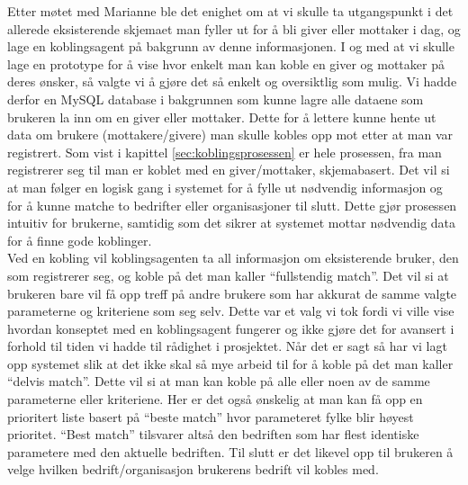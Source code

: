Etter møtet med Marianne ble det enighet om at vi skulle ta utgangspunkt i det allerede eksisterende skjemaet man fyller ut for å bli giver eller mottaker i dag, og lage en koblingsagent på bakgrunn av denne informasjonen. I og med at vi skulle lage en prototype for å vise hvor enkelt man kan koble en giver og mottaker på deres ønsker, så valgte vi å gjøre det så enkelt og oversiktlig som mulig. Vi hadde derfor en MySQL database i bakgrunnen som kunne lagre alle dataene som brukeren la inn om en giver eller mottaker. Dette for å lettere kunne hente ut data om brukere (mottakere/givere) man skulle kobles opp mot etter at man var registrert. Som vist i kapittel \ref{sec:koblingsprosessen} er hele prosessen, fra man registrerer seg til man er koblet med en giver/mottaker, skjemabasert. Det vil si at man følger en logisk gang i systemet for å fylle ut nødvendig informasjon og for å kunne matche to bedrifter eller organisasjoner til slutt. Dette gjør prosessen intuitiv for brukerne, samtidig som det sikrer at systemet mottar nødvendig data for å finne gode koblinger.\\

Ved en kobling vil koblingsagenten ta all informasjon om eksisterende bruker, den som registrerer seg, og koble på det man kaller ``fullstendig match''. Det vil si at brukeren bare vil få opp treff på andre brukere som har akkurat de samme valgte parameterne og kriteriene som seg selv. Dette var et valg vi tok fordi vi ville vise hvordan konseptet med en koblingsagent fungerer og ikke gjøre det for avansert i forhold til tiden vi hadde til rådighet i prosjektet. Når det er sagt så har vi lagt opp systemet slik at det ikke skal så mye arbeid til for å koble på det man kaller ``delvis match''. Dette vil si at man kan koble på alle eller noen av de samme parameterne eller kriteriene. Her er det også ønskelig at man kan få opp en prioritert liste basert på ``beste match'' hvor parameteret fylke blir høyest prioritet. ``Best match'' tilsvarer altså den bedriften som har flest identiske parametere med den aktuelle bedriften. Til slutt er det likevel opp til brukeren å velge hvilken bedrift/organisasjon brukerens bedrift vil kobles med.

